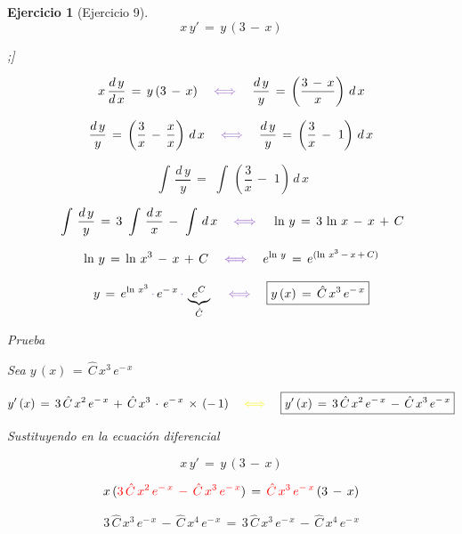 \documentclass[a4paper,11pt]{book}
\newtheorem{ejer}{Ejercicio}[section]
\newcommand*{\itembolasazules}[1]{%

\footnotesize\protect\tikz[baseline=-3pt]%

\protect\node[scale=.7, circle, shade, ball 

color=green]{\color{white}\Large\bf#1};}
\begin{document}
\begin{ejer}[Ejercicio 9] 

  $$x\,y'\,=\,y\,(3\,-\,x)$$ 
  
\begin{enumerate}[label=\itembolasazules{\arabic*}] 

  

 $$x\,\dfrac{d\,y}{d\,x}\,=\,y\,(3\,-\,x) \quad \textcolor{amethyst}{\iff} \quad \dfrac{d\,y}{y}\,=\,\left(\dfrac{3\,-\,x}{x} \right)\,d\,x$$ 

  

 $$\dfrac{d\,y}{y}\,=\,\left(\dfrac{3}{x}\,-\,\dfrac{x}{x} \right)\,d\,x \quad \textcolor{amethyst}{\iff} \quad \dfrac{d\,y}{y}\,=\,\left(\dfrac{3}{x}\,-\,\,1 \right)\,d\,x$$ 

  
 $$\displaystyle\,\int\,\dfrac{d\,y}{y}\,=\,\displaystyle\,\int\,\left(\dfrac{3}{x}\,-\,\,1 \right)\,d\,x$$ 

  

 $$\displaystyle\,\int\,\dfrac{d\,y}{y}\,=\,3\,\displaystyle\,\int\,\dfrac{d\,x}{x}\,-\,\displaystyle\,\int\,d\,x \quad \textcolor{amethyst}{\iff} \quad \ln\,y\,=\,3\,\ln\,x\,-\,x\,+\,C$$ 

  

 $$\ln\,y\,=\,\ln\,x^{3}\,-\,x\,+\,C \quad \textcolor{amethyst}{\iff} \quad e^{\ln\,y}\,=\,e^{(\ln\,x^{3}\,-\,x\,+\,C)}$$ 

  

 $$y\,=\,e^{\ln\,x^{3}}\,\textcolor{amethyst}{\cdot}\,e^{-\,x}\,\textcolor{amethyst}{\cdot}\,\underbrace{e^{C}}_{\hat{C}} \quad \textcolor{amethyst}{\iff} \quad \boxed{y\,(x)\,=\,\hat{C}\,x^{3}\,e^{-\,x}}$$ 

  

Prueba  

Sea $\boxed{y\,(x)\,=\,\hat{C}\,x^{3}\,e^{-\,x}}$ 

  

$$y'\,(x)\,=\,3\,\hat{C}\,x^{2}\,e^{-\,x}\,+\,\hat{C}\,x^{3}\,\cdot\,e^{-\,x}\,\times\,(-\,1) \quad \textcolor{yellow}{\iff} \quad \boxed{y'\,(x)\,=\,3\,\hat{C}\,x^{2}\,e^{-\,x}\,-\,\hat{C}\,x^{3}\,e^{-\,x}}$$ 

  

Sustituyendo en la ecuación diferencial 

  

$$x\,y'\,=\,y\,(3\,-\,x)$$  

  

$$x\,(\textcolor{red}{3\,\hat{C}\,x^{2}\,e^{-\,x}\,-\,\hat{C}\,x^{3}\,e^{-\,x}})\,=\,\textcolor{red}{\hat{C}\,x^{3}\,e^{-\,x}}\,(3\,-\,x)$$ 

  

$$\boxed{3\,\hat{C}\,x^{3}\,e^{-\,x}\,-\,\hat{C}\,x^{4}\,e^{-\,x}\,=\,3\,\hat{C}\,x^{3}\,e^{-\,x}\,-\,\hat{C}\,x^{4}\,e^{-\,x}}$$ 

  

\end{enumerate} 

\end{ejer} 
\end{document}
